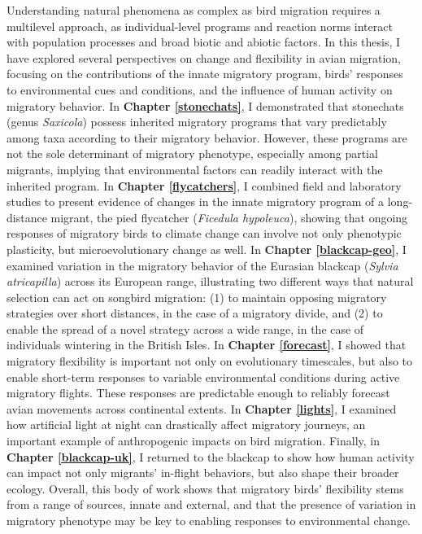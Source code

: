 \documentclass[a4paper, nobind]{templates/ociamthesis}
\begin{document}
Understanding natural phenomena as complex as bird migration requires a multilevel approach, as individual-level programs and reaction norms interact with population processes and broad biotic and abiotic factors. In this thesis, I have explored several perspectives on change and flexibility in avian migration, focusing on the contributions of the innate migratory program, birds' responses to environmental cues and conditions, and the influence of human activity on migratory behavior. In \textbf{Chapter \ref{stonechats}}, I demonstrated that stonechats (genus \emph{Saxicola}) possess inherited migratory programs that vary predictably among taxa according to their migratory behavior. However, these programs are not the sole determinant of migratory phenotype, especially among partial migrants, implying that environmental factors can readily interact with the inherited program. In \textbf{Chapter \ref{flycatchers}}, I combined field and laboratory studies to present evidence of changes in the innate migratory program of a long-distance migrant, the pied flycatcher (\emph{Ficedula hypoleuca}), showing that ongoing responses of migratory birds to climate change can involve not only phenotypic plasticity, but microevolutionary change as well. In \textbf{Chapter \ref{blackcap-geo}}, I examined variation in the migratory behavior of the Eurasian blackcap (\emph{Sylvia atricapilla}) across its European range, illustrating two different ways that natural selection can act on songbird migration: (1) to maintain opposing migratory strategies over short distances, in the case of a migratory divide, and (2) to enable the spread of a novel strategy across a wide range, in the case of individuals wintering in the British Isles. In \textbf{Chapter \ref{forecast}}, I showed that migratory flexibility is important not only on evolutionary timescales, but also to enable short-term responses to variable environmental conditions during active migratory flights. These responses are predictable enough to reliably forecast avian movements across continental extents. In \textbf{Chapter \ref{lights}}, I examined how artificial light at night can drastically affect migratory journeys, an important example of anthropogenic impacts on bird migration. Finally, in \textbf{Chapter \ref{blackcap-uk}}, I returned to the blackcap to show how human activity can impact not only migrants' in-flight behaviors, but also shape their broader ecology. Overall, this body of work shows that migratory birds' flexibility stems from a range of sources, innate and external, and that the presence of variation in migratory phenotype may be key to enabling responses to environmental change.
\end{document}
